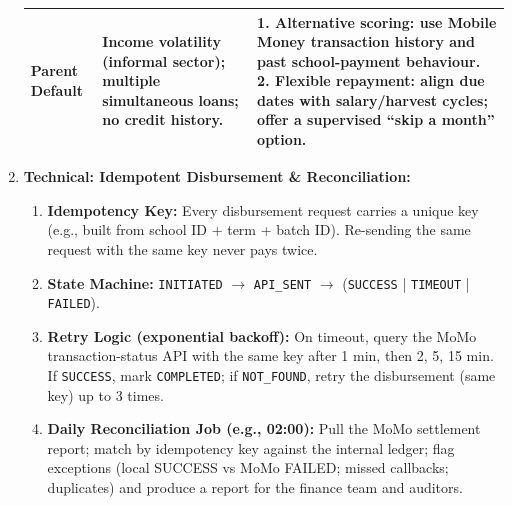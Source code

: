 \documentclass[11pt]{article}
\begin{document}
\begin{exoresolu}
\begin{enumerate}
\begin{center}
\begin{tabularx}{\linewidth}{|l|X|X|}
    Parent Default & Income volatility (informal sector); multiple simultaneous loans; no credit history. & 1. \textbf{Alternative scoring:} use Mobile Money transaction history and past school-payment behaviour. 2. \textbf{Flexible repayment:} align due dates with salary/harvest cycles; offer a supervised ``skip a month'' option. \\ \hline
    \end{tabularx}
    \end{center}
    \item \textbf{Technical: Idempotent Disbursement \& Reconciliation:}
    \begin{enumerate}
        \item \textbf{Idempotency Key:} Every disbursement request carries a unique key (e.g., built from school ID + term + batch ID). Re-sending the same request with the same key never pays twice.
        \item \textbf{State Machine:} \texttt{INITIATED} $\to$ \texttt{API\_SENT} $\to$ (\texttt{SUCCESS} | \texttt{TIMEOUT} | \texttt{FAILED}).
        \item \textbf{Retry Logic (exponential backoff):} On timeout, query the MoMo transaction-status API with the same key after 1 min, then 2, 5, 15 min. If \texttt{SUCCESS}, mark \texttt{COMPLETED}; if \texttt{NOT\_FOUND}, retry the disbursement (same key) up to 3 times.
        \item \textbf{Daily Reconciliation Job (e.g., 02:00):} Pull the MoMo settlement report; match by idempotency key against the internal ledger; flag exceptions (local SUCCESS vs MoMo FAILED; missed callbacks; duplicates) and produce a report for the finance team and auditors.
    \end{enumerate}
\end{enumerate}
\end{exoresolu}
\end{document}
